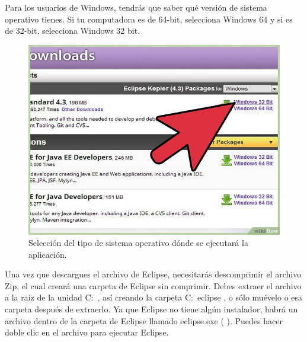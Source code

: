  Para los
usuarios de Windows, tendrás que saber qué versión de sistema operativo tienes.
Si tu computadora es de 64-bit, selecciona Windows 64 y si es de 32-bit,
selecciona Windows 32 bit. 

\begin{figure}[H]
	\begin{center}
		\includegraphics[scale=.4]{images/instalaciones/eclipse/img_eclipse_2}
		\caption{Selección del tipo de sistema operativo dónde se ejecutará la aplicación.}
	\end{center}
\end{figure}

Una vez que descargues el archivo
de Eclipse, necesitarás descomprimir el archivo Zip, el cual creará una carpeta
de Eclipse sin comprimir. Debes extraer el archivo a la raíz de la unidad C:\ ,
así creando la carpeta 
C:\ eclipse , o sólo muévelo o esa carpeta después de
extraerlo. Ya que Eclipse no tiene algún instalador, habrá un archivo dentro de
la carpeta de Eclipse llamado eclipse.exe ( ). Puedes hacer doble clic en el
archivo para ejecutar Eclipse.

